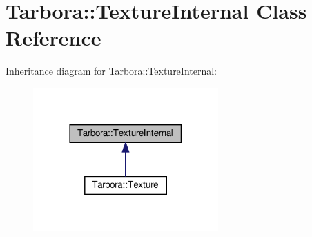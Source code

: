 \hypertarget{classTarbora_1_1TextureInternal}{}\section{Tarbora\+:\+:Texture\+Internal Class Reference}
\label{classTarbora_1_1TextureInternal}


Inheritance diagram for Tarbora\+:\+:Texture\+Internal\+:
\nopagebreak
\begin{figure}[H]
\begin{center}
\leavevmode
\includegraphics[width=201pt]{classTarbora_1_1TextureInternal__inherit__graph}
\end{center}
\end{figure}
